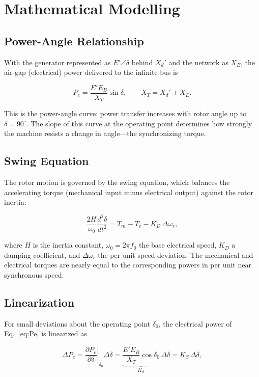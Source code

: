 \documentclass[12pt,a4paper]{article}
\newcommand{\ddel}{\Delta\delta}
\begin{document}
\section{Mathematical Modelling}
\label{sec:model}

\subsection{Power-Angle Relationship}

With the generator represented as $E'\angle\delta$ behind $X_d'$ and the network
as $X_E$, the air-gap (electrical) power delivered to the infinite bus is

\begin{equation}
P_e = \frac{E' E_B}{X_T}\sin\delta,
\qquad X_T = X_d' + X_E.
\label{eq:Pe}
\end{equation}

This is the power-angle curve: power transfer increases with rotor angle up to
$\delta = 90^\circ$. The slope of this curve at the operating point determines
how strongly the machine resists a change in angle---the synchronizing torque.

\subsection{Swing Equation}

The rotor motion is governed by the swing equation, which balances the
accelerating torque (mechanical input minus electrical output) against the rotor
inertia:

\begin{equation}
\frac{2H}{\omega_0}\frac{d^2\delta}{dt^2}
= T_m - T_e - K_D\,\Delta\omega_r,
\label{eq:swing}
\end{equation}

where $H$ is the inertia constant, $\omega_0 = 2\pi f_0$ the base electrical
speed, $K_D$ a damping coefficient, and $\Delta\omega_r$ the per-unit speed
deviation. The mechanical and electrical torques are nearly equal to the
corresponding powers in per unit near synchronous speed.

\subsection{Linearization}

For small deviations about the operating point $\delta_0$, the electrical power
of Eq.~\eqref{eq:Pe} is linearized as

\begin{equation}
\Delta P_e
= \left.\frac{\partial P_e}{\partial \delta}\right|_{\delta_0}\!\ddel
= \underbrace{\frac{E' E_B}{X_T}\cos\delta_0}_{K_S}\,\ddel
= K_S\,\ddel,
\label{eq:Ks}
\end{equation}
\end{document}
